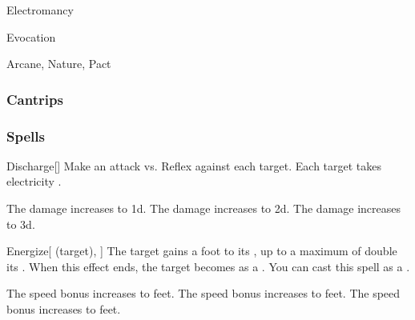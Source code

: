 \newpage
\begin{spellsection}{Electromancy}

\begin{spellheader}
\end{spellheader}


 Evocation

 Arcane, Nature, Pact

\subsubsection{Cantrips}


\end{spellsection}


\subsubsection{Spells}


\lowercase{\hypertarget{spell:Discharge}{}}\label{spell:Discharge}
\begin{freeability}[Rank 1]{\hypertarget{spell:Discharge}{Discharge}}[]
Make an attack vs. Reflex against each target.
\hit Each target takes electricity .

\rankline
{} The damage increases to  \plus1d.
 The damage increases to  \plus2d.
 The damage increases to  \plus3d.
\end{freeability}
\vspace{0.25em}



\lowercase{\hypertarget{spell:Energize}{}}\label{spell:Energize}
\begin{attuneability}[Rank 1]{\hypertarget{spell:Energize}{Energize}}[ (target), ]
The target gains a  foot  to its , up to a maximum of double its .
When this effect ends, the target becomes  as a .
You can cast this spell as a .

\rankline
{} The speed bonus increases to  feet.
 The speed bonus increases to  feet.
 The speed bonus increases to  feet.
\end{attuneability}
\vspace{0.25em}



